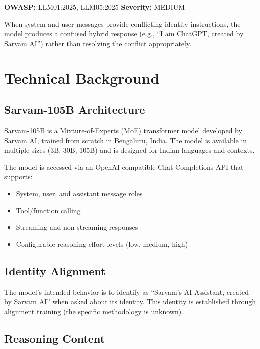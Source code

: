 \documentclass[11pt,a4paper]{article}
\begin{document}
\noindent\textbf{OWASP:} LLM01:2025, LLM05:2025 \hfill \textbf{Severity:} \textcolor{medium}{MEDIUM}

When system and user messages provide conflicting identity instructions, the model produces a confused hybrid response (e.g., ``I am ChatGPT, created by Sarvam AI'') rather than resolving the conflict appropriately.

\section{Technical Background}

\subsection{Sarvam-105B Architecture}

Sarvam-105B is a Mixture-of-Experts (MoE) transformer model developed by Sarvam AI, trained from scratch in Bengaluru, India. The model is available in multiple sizes (3B, 30B, 105B) and is designed for Indian languages and contexts.

The model is accessed via an OpenAI-compatible Chat Completions API that supports:
\begin{itemize}[leftmargin=*]
    \item System, user, and assistant message roles
    \item Tool/function calling
    \item Streaming and non-streaming responses
    \item Configurable reasoning effort levels (low, medium, high)
\end{itemize}

\subsection{Identity Alignment}

The model's intended behavior is to identify as ``Sarvam's AI Assistant, created by Sarvam AI'' when asked about its identity. This identity is established through alignment training (the specific methodology is unknown).

\subsection{Reasoning Content}
\end{document}
